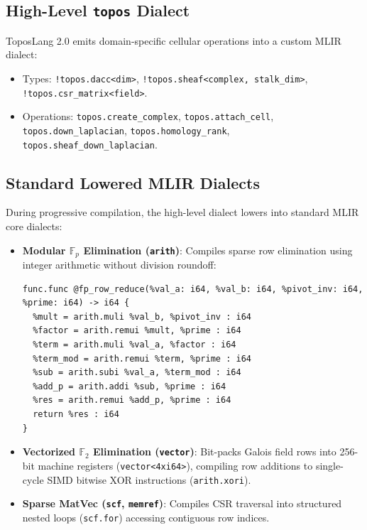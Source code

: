 \documentclass[conference]{IEEEtran}
\begin{document}
\subsection{High-Level \texttt{topos} Dialect}
ToposLang 2.0 emits domain-specific cellular operations into a custom MLIR dialect:
\begin{itemize}
    \item Types: \texttt{!topos.dacc<dim>}, \texttt{!topos.sheaf<complex, stalk\_dim>}, \texttt{!topos.csr\_matrix<field>}.
    \item Operations: \texttt{topos.create\_complex}, \texttt{topos.attach\_cell}, \texttt{topos.down\_laplacian}, \texttt{topos.homology\_rank}, \texttt{topos.sheaf\_down\_laplacian}.
\end{itemize}

\subsection{Standard Lowered MLIR Dialects}
During progressive compilation, the high-level dialect lowers into standard MLIR core dialects:
\begin{itemize}
    \item \textbf{Modular $\mathbb{F}_p$ Elimination (\texttt{arith})}: Compiles sparse row elimination using integer arithmetic without division roundoff:
\begin{lstlisting}
func.func @fp_row_reduce(%val_a: i64, %val_b: i64, %pivot_inv: i64, %prime: i64) -> i64 {
  %mult = arith.muli %val_b, %pivot_inv : i64
  %factor = arith.remui %mult, %prime : i64
  %term = arith.muli %val_a, %factor : i64
  %term_mod = arith.remui %term, %prime : i64
  %sub = arith.subi %val_a, %term_mod : i64
  %add_p = arith.addi %sub, %prime : i64
  %res = arith.remui %add_p, %prime : i64
  return %res : i64
}
\end{lstlisting}
    \item \textbf{Vectorized $\mathbb{F}_2$ Elimination (\texttt{vector})}: Bit-packs Galois field rows into 256-bit machine registers (\texttt{vector<4xi64>}), compiling row additions to single-cycle SIMD bitwise XOR instructions (\texttt{arith.xori}).
    \item \textbf{Sparse MatVec (\texttt{scf}, \texttt{memref})}: Compiles CSR traversal into structured nested loops (\texttt{scf.for}) accessing contiguous row indices.
\end{itemize}
\end{document}
